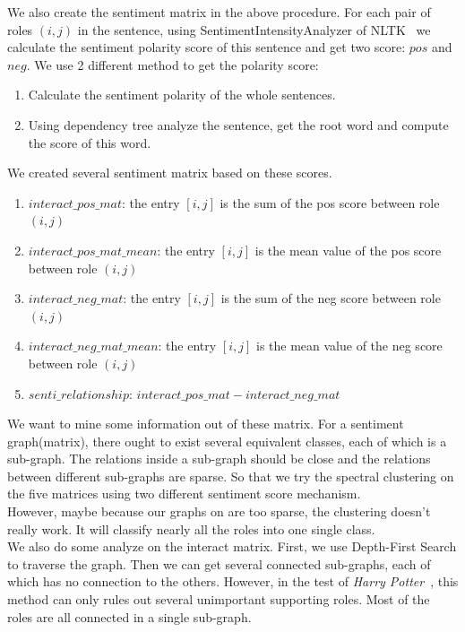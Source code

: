 \documentclass[11pt]{article}
\begin{document}
We also create the sentiment matrix in the above procedure. For each pair of roles $(i, j)$
in the sentence, using SentimentIntensityAnalyzer of NLTK~\cite{Loper02nltk:the} we calculate the sentiment polarity score of this sentence and get two score: $pos$ and $neg$. We use 2 different method to get the polarity score:
\begin{enumerate}
    \item Calculate the sentiment polarity of the whole sentences.
    \item Using dependency tree analyze the sentence, get the root word and compute the score of this word.
\end{enumerate}
We created several sentiment matrix based on these scores.
\begin{enumerate}
    \item $interact\_pos\_mat$: the entry $[i, j]$ is the sum of the pos score between role $(i, j)$
    \item $interact\_pos\_mat\_mean$: the entry $[i, j]$ is the mean value of the pos score between role $(i, j)$
    \item $interact\_neg\_mat$: the entry $[i, j]$ is the sum of the neg score between role $(i, j)$
    \item $interact\_neg\_mat\_mean$: the entry $[i, j]$ is the mean value of the neg score between role $(i, j)$
    \item $senti\_relationship$: $interact\_pos\_mat - interact\_neg\_mat$
\end{enumerate}

We want to mine some information out of these matrix. For a sentiment graph(matrix), there ought to exist several equivalent classes, each of which is a sub-graph. The relations inside a sub-graph should be close and the relations between different sub-graphs are sparse. So that we try the spectral clustering on the five matrices using two different sentiment score mechanism. \\
However, maybe because our graphs on are too sparse, the clustering doesn't really work. It will classify nearly all the roles into one single class. \\

We also do some analyze on the interact matrix. First, we use Depth-First Search to traverse the graph. Then we can get several connected sub-graphs, each of which has no connection to the others. However, in the test of \textit{Harry Potter}~\cite{harrypotter}, this method can only rules out several unimportant supporting roles. Most of the roles are all connected in a single sub-graph. \\
\end{document}
